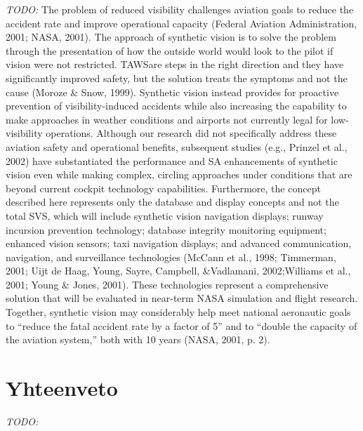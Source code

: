 \documentclass[utf8,bachelor,manualbib]{gradu3}
\begin{document}
\emph{TODO:}
The problem of reduced visibility challenges aviation goals to reduce the accident
rate and improve operational capacity (Federal Aviation Administration, 2001;
NASA, 2001). The approach of synthetic vision is to solve the problem through the
presentation of how the outside world would look to the pilot if vision were not restricted.
TAWSare steps in the right direction and they have significantly improved
safety, but the solution treats the symptoms and not the cause (Moroze \& Snow,
1999). Synthetic vision instead provides for proactive prevention of visibility-induced
accidents while also increasing the capability to make approaches in
weather conditions and airports not currently legal for low-visibility operations.
Although our research did not specifically address these aviation safety and operational
benefits, subsequent studies (e.g., Prinzel et al., 2002) have substantiated the
performance and SA enhancements of synthetic vision even while making complex,
circling approaches under conditions that are beyond current cockpit technology
capabilities. Furthermore, the concept described here represents only the
database and display concepts and not the total SVS, which will include synthetic
vision navigation displays; runway incursion prevention technology; database integrity
monitoring equipment; enhanced vision sensors; taxi navigation displays;
and advanced communication, navigation, and surveillance technologies
(McCann et al., 1998; Timmerman, 2001; Uijt de Haag, Young, Sayre, Campbell,
\&Vadlamani, 2002;Williams et al., 2001; Young \& Jones, 2001). These technologies
represent a comprehensive solution that will be evaluated in near-term NASA
simulation and flight research. Together, synthetic vision may considerably help
meet national aeronautic goals to “reduce the fatal accident rate by a factor of 5”
and to “double the capacity of the aviation system,” both with 10 years (NASA,
2001, p. 2). \citep{prinzel2004}


\chapter{Yhteenveto} \emph{TODO:}
\end{document}

